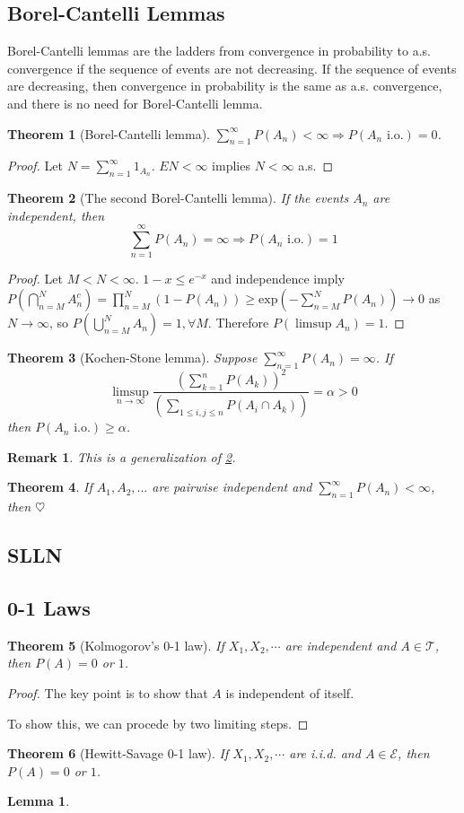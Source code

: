 \documentclass{article}
\newtheorem{Thm}{Theorem}[section]
\newtheorem{Lem}{Lemma}[section]
\newtheorem*{Rk}{Remark}
\theoremstyle{definition}
\begin{document}
\subsection{Borel-Cantelli Lemmas}
Borel-Cantelli lemmas are the ladders from convergence in probability to a.s. convergence if the sequence of events are not decreasing.
If the sequence of events are decreasing, then convergence in probability is the same as a.s. convergence, and there is no need for Borel-Cantelli lemma.
\begin{Thm}[Borel-Cantelli lemma]
$\sum_{n=1}^\infty P(A_n)<\infty\Longrightarrow P(A_n\text{ i.o.})=0$.
\end{Thm}
\begin{proof}
Let $N=\sum_{n=1}^\infty 1_{A_n}$. $EN<\infty$ implies $N<\infty$ a.s.
\end{proof}
\begin{Thm}[The second Borel-Cantelli lemma]\label{The second Borel-Cantelli lemma}
If the events $A_n$ are independent, then \[\sum_{n=1}^\infty P(A_n)=\infty\Longrightarrow P(A_n\text{ i.o.})=1\]
\end{Thm}
\begin{proof}
Let $M<N<\infty$. $1-x\le e^{-x}$ and independence imply $P(\bigcap_{n=M}^{N}A_n^c)=\prod_{n=M}^N(1-P(A_n))\ge \text{exp}(-\sum_{n=M}^NP(A_n))\to 0$ as $N\to\infty$, so $P(\bigcup_{n=M}^{N}A_n)=1,\forall M$. Therefore $P(\limsup A_n)=1$.
\end{proof}
\begin{Thm}[Kochen-Stone lemma]
Suppose $\sum_{n=1}^\infty P(A_n)=\infty$. If 
\[\limsup_{n\to\infty}\frac{(\sum_{k=1}^nP(A_k))^2}{(\sum_{1\le i,j\le n} P(A_i\cap A_k))}=\alpha>0\] then $P(A_n\text{ i.o.})\ge\alpha$.
\end{Thm}
\begin{Rk}
This is a generalization of \ref{The second Borel-Cantelli lemma}.
\end{Rk}
\begin{Thm}
If $A_1,A_2,...$ are pairwise independent and $\sum_{n=1}^\infty P(A_n)<\infty$, then $\heartsuit$
\end{Thm}
\subsection{SLLN}
\subsection{0-1 Laws}
\begin{Thm}[Kolmogorov's 0-1 law]
    If $X_1,X_2,\cdots$ are independent and $A\in\mathcal{T}$, then $P(A)=0$ or $1$.
\end{Thm}
\begin{proof}
    The key point is to show that $A$ is independent of itself.\par
    To show this, we can procede by two limiting steps.
\end{proof}
\begin{Thm}[Hewitt-Savage 0-1 law]
    If $X_1,X_2,\cdots$ are i.i.d. and $A\in\mathcal{E}$, then $P(A)=0$ or $1$.
\end{Thm}
\begin{Lem}
    
\end{Lem}
\end{document}
